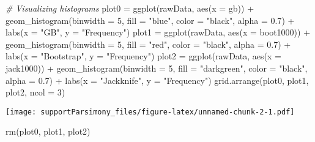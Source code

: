 \documentclass[
]{article}
\newenvironment{Shaded}{\begin{snugshade}}{\end{snugshade}}
\newcommand{\AttributeTok}[1]{\textcolor[rgb]{0.77,0.63,0.00}{#1}}
\newcommand{\CommentTok}[1]{\textcolor[rgb]{0.56,0.35,0.01}{\textit{#1}}}
\newcommand{\DecValTok}[1]{\textcolor[rgb]{0.00,0.00,0.81}{#1}}
\newcommand{\FloatTok}[1]{\textcolor[rgb]{0.00,0.00,0.81}{#1}}
\newcommand{\FunctionTok}[1]{\textcolor[rgb]{0.00,0.00,0.00}{#1}}
\newcommand{\NormalTok}[1]{#1}
\newcommand{\OtherTok}[1]{\textcolor[rgb]{0.56,0.35,0.01}{#1}}
\newcommand{\SpecialCharTok}[1]{\textcolor[rgb]{0.00,0.00,0.00}{#1}}
\newcommand{\StringTok}[1]{\textcolor[rgb]{0.31,0.60,0.02}{#1}}
\begin{document}
\begin{Shaded}
\begin{Highlighting}[]
\CommentTok{\# Visualizing histograms}
\NormalTok{plot0 }\OtherTok{=} \FunctionTok{ggplot}\NormalTok{(rawData, }\FunctionTok{aes}\NormalTok{(}\AttributeTok{x =}\NormalTok{ gb)) }\SpecialCharTok{+}
  \FunctionTok{geom\_histogram}\NormalTok{(}\AttributeTok{binwidth =} \DecValTok{5}\NormalTok{, }\AttributeTok{fill =} \StringTok{"blue"}\NormalTok{, }\AttributeTok{color =} \StringTok{"black"}\NormalTok{, }\AttributeTok{alpha =} \FloatTok{0.7}\NormalTok{) }\SpecialCharTok{+}
  \FunctionTok{labs}\NormalTok{(}\AttributeTok{x =} \StringTok{"GB"}\NormalTok{, }\AttributeTok{y =} \StringTok{"Frequency"}\NormalTok{)}
\NormalTok{plot1 }\OtherTok{=} \FunctionTok{ggplot}\NormalTok{(rawData, }\FunctionTok{aes}\NormalTok{(}\AttributeTok{x =}\NormalTok{ boot1000)) }\SpecialCharTok{+}
  \FunctionTok{geom\_histogram}\NormalTok{(}\AttributeTok{binwidth =} \DecValTok{5}\NormalTok{, }\AttributeTok{fill =} \StringTok{"red"}\NormalTok{, }\AttributeTok{color =} \StringTok{"black"}\NormalTok{, }\AttributeTok{alpha =} \FloatTok{0.7}\NormalTok{) }\SpecialCharTok{+}
  \FunctionTok{labs}\NormalTok{(}\AttributeTok{x =} \StringTok{"Bootstrap"}\NormalTok{, }\AttributeTok{y =} \StringTok{"Frequency"}\NormalTok{)}
\NormalTok{plot2 }\OtherTok{=} \FunctionTok{ggplot}\NormalTok{(rawData, }\FunctionTok{aes}\NormalTok{(}\AttributeTok{x =}\NormalTok{ jack1000)) }\SpecialCharTok{+}
  \FunctionTok{geom\_histogram}\NormalTok{(}\AttributeTok{binwidth =} \DecValTok{5}\NormalTok{, }\AttributeTok{fill =} \StringTok{"darkgreen"}\NormalTok{, }\AttributeTok{color =} \StringTok{"black"}\NormalTok{, }\AttributeTok{alpha =} \FloatTok{0.7}\NormalTok{) }\SpecialCharTok{+}
  \FunctionTok{labs}\NormalTok{(}\AttributeTok{x =} \StringTok{"Jackknife"}\NormalTok{, }\AttributeTok{y =} \StringTok{"Frequency"}\NormalTok{)}
\FunctionTok{grid.arrange}\NormalTok{(plot0, plot1, plot2, }\AttributeTok{ncol =} \DecValTok{3}\NormalTok{)}
\end{Highlighting}
\end{Shaded}

\texttt{[image: supportParsimony\_files/figure-latex/unnamed-chunk-2-1.pdf]}

\begin{Shaded}
\begin{Highlighting}[]
\FunctionTok{rm}\NormalTok{(plot0, plot1, plot2)}
\end{Highlighting}
\end{Shaded}
\end{document}
